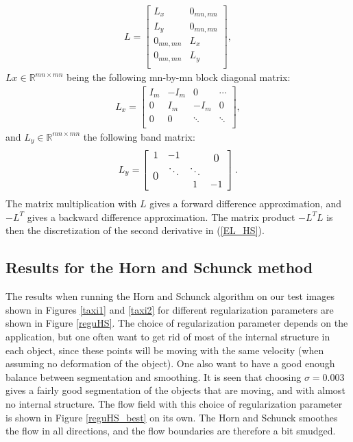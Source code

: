 \documentclass[10pt,a4paper]{article}
\newcommand\bigzero{\makebox(0,0){\text{\large 0}}}
\begin{document}
\begin{align*}
L = \left[
\begin{array}{c|c}
L_x & 0_{mn,mn} \\
L_y & 0_{mn,mn} \\
0_{mn,mn} & L_x \\
0_{mn,mn} & L_y \\
\end{array}
\right],
\end{align*}
$Lx \in \mathbb{R}^{mn \times mn}$ being the following mn-by-mn block diagonal matrix:
\begin{align*}
L_x = \left[
\begin{array}{c|c|c|c}
I_{m} & -I_{m} & 0 & \cdots \\ \hline
0 &  I_{m} & -I_{m} & 0 \\ \hline
0 & 0 & \ddots & \ddots \\
\end{array}
\right],
\end{align*}
and $L_y \in \mathbb{R}^{mn \times mn}$ the following band matrix:
\begin{align*}
L_y = \left[
\begin{array}{c c c c}
1 & -1 &  & \bigzero \\ 
 \bigzero & \ddots & \ddots &  \\
 &  & 1 & -1 \\
\end{array}
\right].
\end{align*}
The matrix multiplication with $L$ gives a forward difference approximation, and $-L^T$ gives a backward difference approximation. The matrix product $-L^TL$ is then the discretization of the second derivative in (\ref{EL_HS}).

\subsection{Results for the Horn and Schunck method}
The results when running the Horn and Schunck algorithm on our test images shown in Figures \ref{taxi1} and \ref{taxi2} for different regularization parameters are shown in Figure \ref{reguHS}. The choice of regularization parameter depends on the application, but one often want to get rid of most of the internal structure in each object, since these points will be moving with the same velocity (when assuming no deformation of the object). One also want to have a good enough balance between segmentation and smoothing. It is seen that choosing $\sigma = 0.003$ gives a fairly good segmentation of the objects that are moving, and with almost no internal structure. The flow field with this choice of regularization parameter is shown in Figure \ref{reguHS_best} on its own. The Horn and Schunck smoothes the flow in all directions, and the flow boundaries are therefore a bit smudged. 
\end{document}
